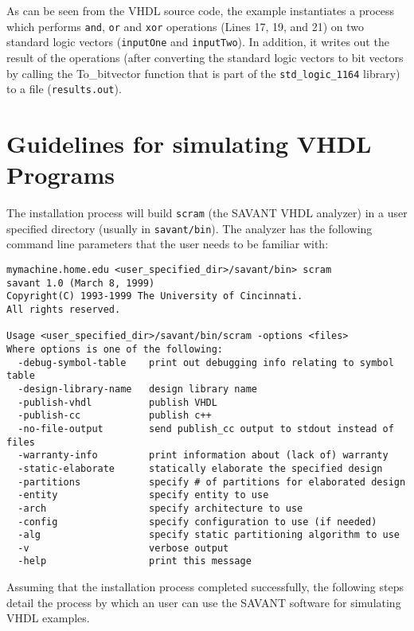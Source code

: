 \documentclass[12pt]{report}
\begin{document}
As can be seen from the VHDL source code, the example instantiates a
process which performs \texttt{and}, \texttt{or} and \texttt{xor}
operations (Lines 17, 19, and 21) on two standard logic vectors
(\texttt{inputOne} and \texttt{inputTwo}). In addition, it writes out the
result of the operations (after converting the standard logic vectors to
bit vectors by calling the \textsf{To\_bitvector} function that is part of
the \texttt{std\_logic\_1164} library) to a file (\texttt{results.out}).

\section{Guidelines for simulating VHDL Programs}

The installation process will build \texttt{scram} (the SAVANT VHDL
analyzer) in a user specified directory (usually in
\texttt{savant/bin}). The analyzer has the following command line
parameters that the user needs to be familiar with: 

\begin{verbatim}
mymachine.home.edu <user_specified_dir>/savant/bin> scram
savant 1.0 (March 8, 1999)
Copyright(C) 1993-1999 The University of Cincinnati.
All rights reserved.

Usage <user_specified_dir>/savant/bin/scram -options <files>
Where options is one of the following:
  -debug-symbol-table    print out debugging info relating to symbol table
  -design-library-name   design library name
  -publish-vhdl          publish VHDL
  -publish-cc            publish c++
  -no-file-output        send publish_cc output to stdout instead of files
  -warranty-info         print information about (lack of) warranty
  -static-elaborate      statically elaborate the specified design
  -partitions            specify # of partitions for elaborated design
  -entity                specify entity to use
  -arch                  specify architecture to use
  -config                specify configuration to use (if needed)
  -alg                   specify static partitioning algorithm to use
  -v                     verbose output
  -help                  print this message

\end{verbatim}

Assuming that the installation process completed successfully, the
following steps detail the process by which an user can use the SAVANT
software for simulating VHDL examples.
\end{document}
